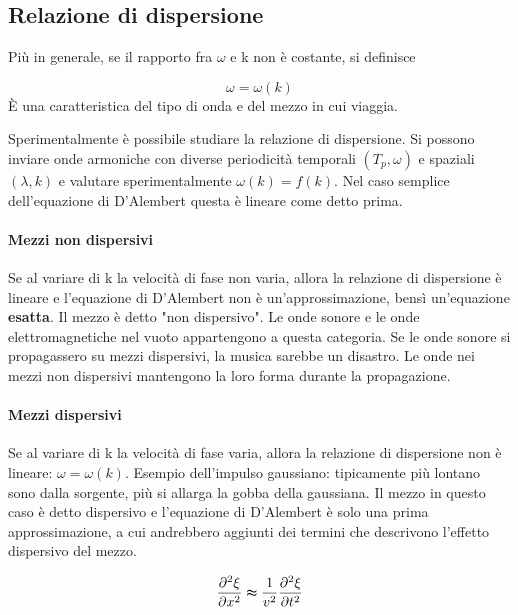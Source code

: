 \subsection{Relazione di dispersione}

Più in generale, se il rapporto fra \(\omega \) e k non è costante, si definisce

\begin{definition}
	\[
		\omega = \omega(k)
	\]
	È una caratteristica del tipo di onda e del mezzo in cui viaggia.
\end{definition}

Sperimentalmente è possibile studiare la relazione di dispersione. Si possono inviare onde armoniche con diverse periodicità temporali \((T_p, \omega )\) e spaziali \((\lambda , k)\) e valutare sperimentalmente \(\omega (k) = f(k)\). Nel caso semplice dell'equazione di D'Alembert questa è lineare come detto prima.

\paragraph{Mezzi non dispersivi}

Se al variare di k la velocità di fase non varia, allora la relazione di dispersione è lineare e l'equazione di D'Alembert non è un'approssimazione, bensì un'equazione \textbf{esatta}. Il mezzo è detto "non dispersivo". Le onde sonore e le onde elettromagnetiche nel vuoto appartengono a questa categoria. Se le onde sonore si propagassero su mezzi dispersivi, la musica sarebbe un disastro. Le onde nei mezzi non dispersivi mantengono la loro forma durante la propagazione.

\paragraph{Mezzi dispersivi}

Se al variare di k la velocità di fase varia, allora la relazione di dispersione non è lineare: \(\omega = \omega(k)\). Esempio dell'impulso gaussiano: tipicamente più lontano sono dalla sorgente, più si allarga la gobba della gaussiana. Il mezzo in questo caso è detto dispersivo e l'equazione di D'Alembert è solo una prima approssimazione, a cui andrebbero aggiunti dei termini che descrivono l'effetto dispersivo del mezzo.

\[
	\frac{\partial ^{2} \xi }{\partial x^{2} } \thickapprox \frac{1}{v^{2} }\frac{\partial ^{2} \xi }{\partial t^{2} } 
\]

